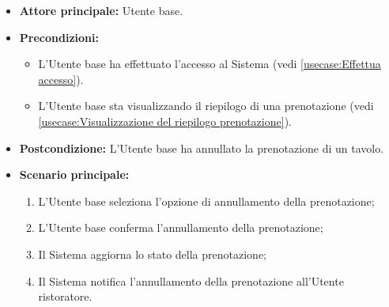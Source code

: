 \label{usecase:Annullamento della prenotazione}
\begin{itemize}
	\item \textbf{Attore principale:} Utente base.

	\item \textbf{Precondizioni:}
	      \begin{itemize}
		      \item L'Utente base ha effettuato l'accesso al Sistema (vedi \autoref{usecase:Effettua accesso}).
		      \item L'Utente base sta visualizzando il riepilogo di una prenotazione (vedi \autoref{usecase:Visualizzazione del riepilogo prenotazione}).
	      \end{itemize}

	\item \textbf{Postcondizione:}
	      L'Utente base ha annullato la prenotazione di un tavolo.

	\item \textbf{Scenario principale:}
	      \begin{enumerate}
		      \item L'Utente base seleziona l'opzione di annullamento
		            della prenotazione;

		      \item L'Utente base conferma l'annullamento della prenotazione;

		      \item Il Sistema aggiorna lo stato della prenotazione;

		      \item Il Sistema notifica l'annullamento della prenotazione
		            all'Utente ristoratore.
	      \end{enumerate}
\end{itemize}

